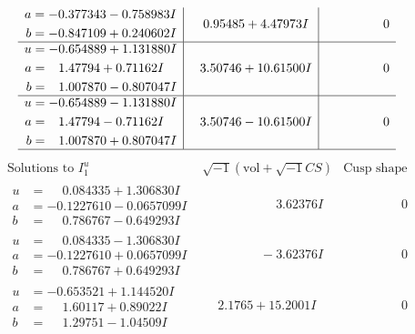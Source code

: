 \documentclass[1p]{elsarticle_modified}
\theoremstyle{definition}
\newcommand{\I}{\sqrt{-1}}
\begin{document}
$$\begin{array}{c|c|c}
\begin{aligned}
a &= -0.377343 - 0.758983 I \\
b &= -0.847109 + 0.240602 I\end{aligned}
 & \phantom{-}0.95485 + 4.47973 I & \phantom{-0.000000 } 0 \\ \hline\begin{aligned}
u &= -0.654889 + 1.131880 I \\
a &= \phantom{-}1.47794 + 0.71162 I \\
b &= \phantom{-}1.007870 - 0.807047 I\end{aligned}
 & \phantom{-}3.50746 + 10.61500 I & \phantom{-0.000000 } 0 \\ \hline\begin{aligned}
u &= -0.654889 - 1.131880 I \\
a &= \phantom{-}1.47794 - 0.71162 I \\
b &= \phantom{-}1.007870 + 0.807047 I\end{aligned}
 & \phantom{-}3.50746 - 10.61500 I & \phantom{-0.000000 } 0\\
 \hline 
 \end{array}$$\newpage$$\begin{array}{c|c|c}  
\text{Solutions to }I^u_{1}& \I (\text{vol} + \sqrt{-1}CS) & \text{Cusp shape}\\
 \hline 
\begin{aligned}
u &= \phantom{-}0.084335 + 1.306830 I \\
a &= -0.1227610 - 0.0657099 I \\
b &= \phantom{-}0.786767 - 0.649293 I\end{aligned}
 & \phantom{-0.000000 -}3.62376 I & \phantom{-0.000000 } 0 \\ \hline\begin{aligned}
u &= \phantom{-}0.084335 - 1.306830 I \\
a &= -0.1227610 + 0.0657099 I \\
b &= \phantom{-}0.786767 + 0.649293 I\end{aligned}
 & \phantom{-0.000000 } -3.62376 I & \phantom{-0.000000 } 0 \\ \hline\begin{aligned}
u &= -0.653521 + 1.144520 I \\
a &= \phantom{-}1.60117 + 0.89022 I \\
b &= \phantom{-}1.29751 - 1.04509 I\end{aligned}
 & \phantom{-}2.1765 + 15.2001 I & \phantom{-0.000000 } 0 \\ \hline\begin{aligned}

\end{aligned}
\end{array}$$
\end{document}
